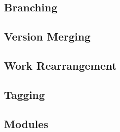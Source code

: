 \subsection{Branching}



\subsection{Version Merging}



\subsection{Work Rearrangement}



\subsection{Tagging}



\subsection{Modules}


